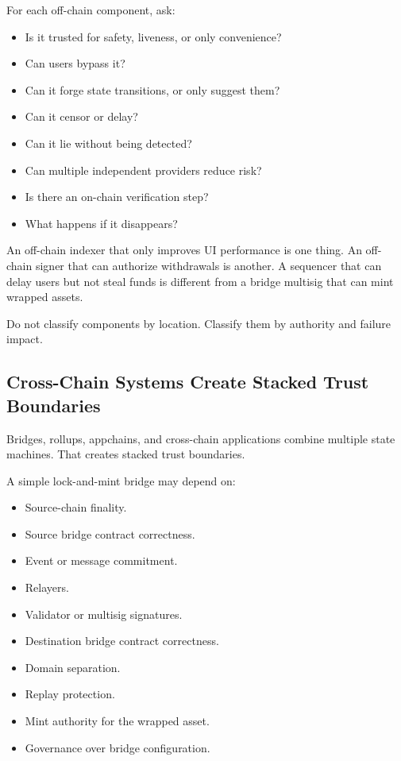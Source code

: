For each off-chain component, ask:

\begin{itemize}
\tightlist
\item
  Is it trusted for safety, liveness, or only convenience?
\item
  Can users bypass it?
\item
  Can it forge state transitions, or only suggest them?
\item
  Can it censor or delay?
\item
  Can it lie without being detected?
\item
  Can multiple independent providers reduce risk?
\item
  Is there an on-chain verification step?
\item
  What happens if it disappears?
\end{itemize}

An off-chain indexer that only improves UI performance is one thing. An
off-chain signer that can authorize withdrawals is another. A sequencer
that can delay users but not steal funds is different from a bridge
multisig that can mint wrapped assets.

Do not classify components by location. Classify them by authority and
failure impact.

\subsection{Cross-Chain Systems Create Stacked Trust Boundaries}

Bridges, rollups, appchains, and cross-chain applications combine
multiple state machines. That creates stacked trust boundaries.

A simple lock-and-mint bridge may depend on:

\begin{itemize}
\tightlist
\item
  Source-chain finality.
\item
  Source bridge contract correctness.
\item
  Event or message commitment.
\item
  Relayers.
\item
  Validator or multisig signatures.
\item
  Destination bridge contract correctness.
\item
  Domain separation.
\item
  Replay protection.
\item
  Mint authority for the wrapped asset.
\item
  Governance over bridge configuration.
\end{itemize}

